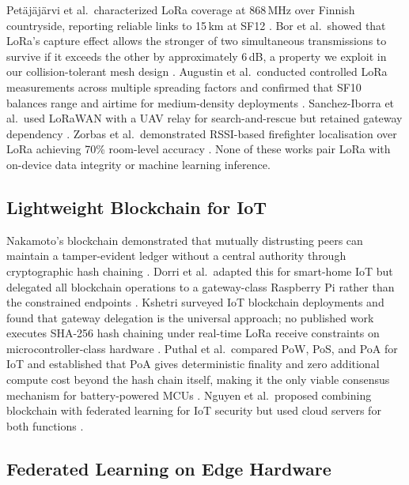 \documentclass[journal]{IEEEtran}
\begin{document}
Petäjäjärvi et al.\ characterized LoRa coverage at 868\,MHz over Finnish
countryside, reporting reliable links to 15\,km at SF12 \cite{Petajajarvi2015}.
Bor et al.\ showed that LoRa's capture effect allows the stronger of two
simultaneous transmissions to survive if it exceeds the other by
approximately 6\,dB, a property we exploit in our collision-tolerant mesh
design \cite{Bor2016}. Augustin et al.\ conducted controlled LoRa
measurements across multiple spreading factors and confirmed that SF10
balances range and airtime for medium-density deployments
\cite{Augustin2016}. Sanchez-Iborra et al.\ used LoRaWAN with a UAV relay
for search-and-rescue but retained gateway dependency
\cite{SanchezIborra2018}. Zorbas et al.\ demonstrated RSSI-based
firefighter localisation over LoRa achieving 70\% room-level accuracy
\cite{Zorbas2020}. None of these works pair LoRa with on-device data
integrity or machine learning inference.

\subsection{Lightweight Blockchain for IoT}

Nakamoto's blockchain demonstrated that mutually distrusting peers can
maintain a tamper-evident ledger without a central authority through
cryptographic hash chaining \cite{Nakamoto2008}. Dorri et al.\ adapted
this for smart-home IoT but delegated all blockchain operations to a
gateway-class Raspberry Pi rather than the constrained endpoints
\cite{Dorri2017}. Kshetri surveyed IoT blockchain deployments and found
that gateway delegation is the universal approach; no published work
executes SHA-256 hash chaining under real-time LoRa receive constraints
on microcontroller-class hardware \cite{Kshetri2017}. Puthal et al.\
compared PoW, PoS, and PoA for IoT and established that PoA gives
deterministic finality and zero additional compute cost beyond the hash
chain itself, making it the only viable consensus mechanism for
battery-powered MCUs \cite{Puthal2018}. Nguyen et al.\ proposed combining
blockchain with federated learning for IoT security but used cloud servers
for both functions \cite{Nguyen2019}.

\subsection{Federated Learning on Edge Hardware}
\end{document}
